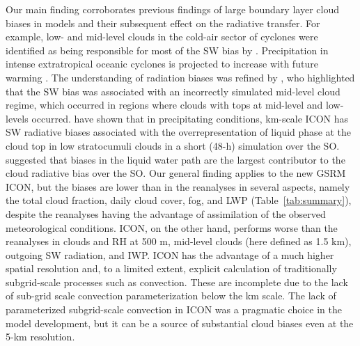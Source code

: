 \documentclass[draft]{agujournal2019}
\begin{document}
Our main finding corroborates previous findings of large boundary layer cloud biases in models and their subsequent effect on the radiative transfer. For example, low- and mid-level clouds in the cold-air sector of cyclones were identified as being responsible for most of the SW bias by . Precipitation in intense extratropical oceanic cyclones is projected to increase with future warming \cite{kodama2019}. The understanding of radiation biases was refined by , who highlighted that the SW bias was associated with an incorrectly simulated mid-level cloud regime, which occurred in regions where clouds with tops at mid-level and low-levels occurred.  have shown that in precipitating conditions, km-scale ICON has SW radiative biases associated with the overrepresentation of liquid phase at the cloud top in low stratocumuli clouds in a short (48-h) simulation over the SO.  suggested that biases in the liquid water path are the largest contributor to the cloud radiative bias over the SO. Our general finding applies to the new GSRM ICON, but the biases are lower than in the reanalyses in several aspects, namely the total cloud fraction, daily cloud cover, fog, and LWP (Table~\ref{tab:summary}), despite the reanalyses having the advantage of assimilation of the observed meteorological conditions. ICON, on the other hand, performs worse than the reanalyses in clouds and RH at 500 m, mid-level clouds (here defined as 1.5 km), outgoing SW radiation, and IWP. ICON has the advantage of a much higher spatial resolution and, to a limited extent, explicit calculation of traditionally subgrid-scale processes such as convection. These are incomplete due to the lack of sub-grid scale convection parameterization below the km scale. The lack of parameterized subgrid-scale convection in ICON was a pragmatic choice in the model development, but it can be a source of substantial cloud biases even at the 5-km resolution.
\end{document}
